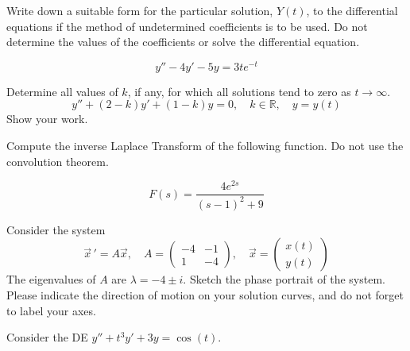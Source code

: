 \documentclass[12pt]{exam}
\begin{document}
    


\newpage


\InitialsRight

\begin{questions}

    \question[3] Write down a suitable form for the particular solution, $Y(t)$, to the differential equations if the method of undetermined coefficients is to be used. Do not determine the values of the coefficients or solve the differential equation. 

    $$y'' - 4y' - 5y = 3te^{-t}$$

    \vspace{7cm}
    
    \question[3] Determine all values of $k$, if any, for which all solutions tend to zero as $t\to\infty$. $$y'' +(2-k)y'+(1-k)y = 0 , \quad k \in \mathbb R, \quad y=y(t)$$ Show your work. \vspace{6cm}  

    
    \newpage 
    
    \question[3]  Compute the inverse Laplace Transform of the following function. Do not use the convolution theorem. 
    
    $$F(s) = \frac{4e^{2s}}{(s-1)^2+9}$$
    
    \vspace{5cm}
    
    \question[3]  Consider the system $$\vec x \, ' = A\vec x, \quad A = \begin{pmatrix} -4&-1\\1&-4 \end{pmatrix}, \quad \vec x = \begin{pmatrix} x(t)\\y(t)\end{pmatrix} $$ The eigenvalues of $A$ are $\lambda = -4\pm i$. Sketch the phase portrait of the system. Please indicate the direction of motion on your solution curves, and do not forget to label your axes.         
    
    \newpage 
    
    \question[2] Consider the DE $y''+ t^3y'+3y = \cos(t)$.
\end{questions}
\end{document}

